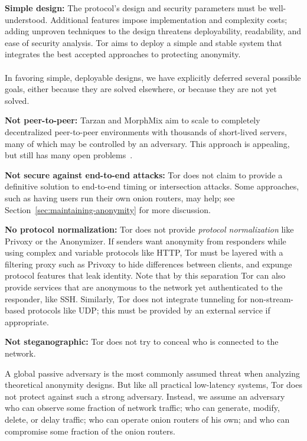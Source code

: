 \documentclass[times,10pt,twocolumn]{article}
\begin{document}
\textbf{Simple design:} The protocol's design and security
parameters must be well-understood. Additional features impose implementation
and complexity costs; adding unproven techniques to the design threatens
deployability, readability, and ease of security analysis. Tor aims to
deploy a simple and stable system that integrates the best accepted
approaches to protecting anonymity.\\

\label{subsec:non-goals}\\
In favoring simple, deployable designs, we have explicitly deferred
several possible goals, either because they are solved elsewhere, or because
they are not yet solved.

\textbf{Not peer-to-peer:} Tarzan and MorphMix aim to scale to completely
decentralized peer-to-peer environments with thousands of short-lived
servers, many of which may be controlled by an adversary.  This approach
is appealing, but still has many open
problems~\cite{tarzan:ccs02,morphmix:fc04}.

\textbf{Not secure against end-to-end attacks:} Tor does not claim
to provide a definitive solution to end-to-end timing or intersection
attacks. Some approaches, such as having users run their own onion routers, 
may help;
see Section~\ref{sec:maintaining-anonymity} for more discussion.

\textbf{No protocol normalization:} Tor does not provide \emph{protocol
normalization} like Privoxy or the Anonymizer. If senders want anonymity from
responders while using complex and variable
protocols like HTTP, Tor must be layered with a filtering proxy such
as Privoxy to hide differences between clients, and expunge protocol
features that leak identity.
Note that by this separation Tor can also provide services that
are anonymous to the network yet authenticated to the responder, like
SSH. Similarly, Tor does not integrate
tunneling for non-stream-based protocols like UDP; this must be
provided by an external service if appropriate.

\textbf{Not steganographic:} Tor does not try to conceal who is connected
to the network.

\label{subsec:threat-model}

A global passive adversary is the most commonly assumed threat when
analyzing theoretical anonymity designs. But like all practical
low-latency systems, Tor does not protect against such a strong
adversary. Instead, we assume an adversary who can observe some fraction
of network traffic; who can generate, modify, delete, or delay
traffic;  who can operate onion routers of his own; and who can
compromise some fraction of the onion routers.
\end{document}

